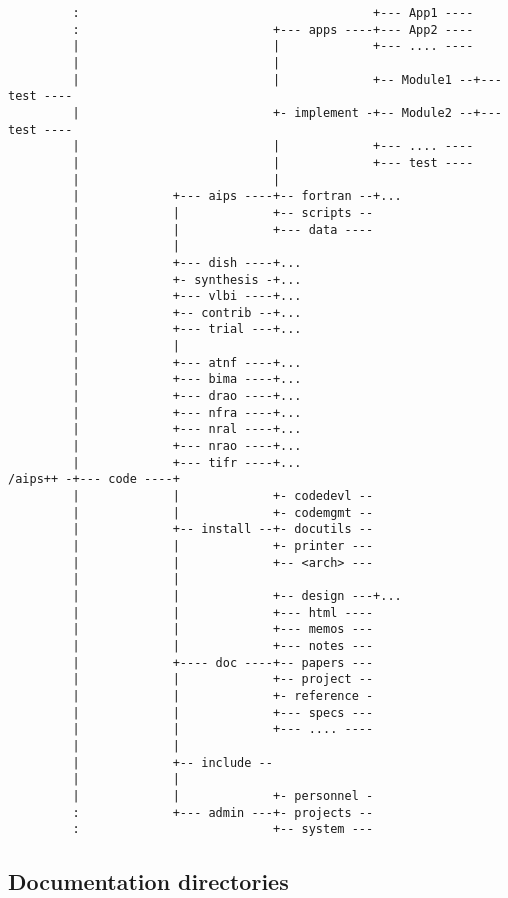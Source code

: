 \begin{verbatim}
         :                                         +--- App1 ----
         :                           +--- apps ----+--- App2 ----
         |                           |             +--- .... ----
         |                           |
         |                           |             +-- Module1 --+--- test ----
         |                           +- implement -+-- Module2 --+--- test ----
         |                           |             +--- .... ----
         |                           |             +--- test ----
         |                           |
         |             +--- aips ----+-- fortran --+...
         |             |             +-- scripts --
         |             |             +--- data ----
         |             |
         |             +--- dish ----+...
         |             +- synthesis -+...
         |             +--- vlbi ----+...
         |             +-- contrib --+...
         |             +--- trial ---+...
         |             |
         |             +--- atnf ----+...
         |             +--- bima ----+...
         |             +--- drao ----+...
         |             +--- nfra ----+...
         |             +--- nral ----+...
         |             +--- nrao ----+...
         |             +--- tifr ----+...
/aips++ -+--- code ----+
         |             |             +- codedevl --
         |             |             +- codemgmt --
         |             +-- install --+- docutils --
         |             |             +- printer ---
         |             |             +-- <arch> ---
         |             |
         |             |             +-- design ---+...
         |             |             +--- html ----
         |             |             +--- memos ---
         |             |             +--- notes ---
         |             +---- doc ----+-- papers ---
         |             |             +-- project --
         |             |             +- reference -
         |             |             +--- specs ---
         |             |             +--- .... ----
         |             |
         |             +-- include --
         |             |
         |             |             +- personnel -
         :             +--- admin ---+- projects --
         :                           +-- system ---
\end{verbatim}


\subsection{Documentation directories}
\label{Documentation directories}

